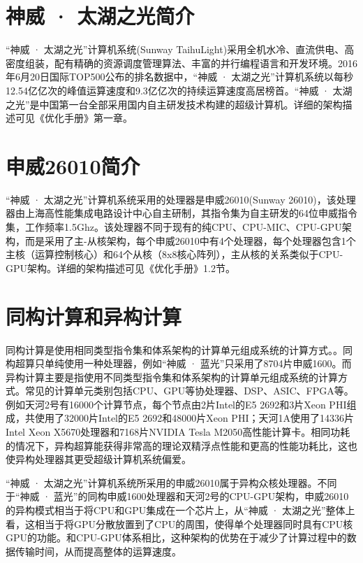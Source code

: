 \section*{神威 · 太湖之光简介}
“神威 · 太湖之光”计算机系统(Sunway TaihuLight)采用全机水冷、直流供电、高密度组装，配有精确的资源调度管理算法、丰富的并行编程语言和开发环境。2016年6月20日国际TOP500公布的排名数据中，“神威 · 太湖之光”计算机系统以每秒12.54亿亿次的峰值运算速度和9.3亿亿次的持续运算速度高居榜首。“神威 · 太湖之光”是中国第一台全部采用国内自主研发技术构建的超级计算机。详细的架构描述可见《优化手册》第一章。

\section*{申威26010简介}
“神威 · 太湖之光”计算机系统采用的处理器是申威26010(Sunway 26010)，该处理器由上海高性能集成电路设计中心自主研制，其指令集为自主研发的64位申威指令集，工作频率1.5Ghz。该处理器不同于现有的纯CPU、CPU-MIC、CPU-GPU架构，而是采用了主-从核架构，每个申威26010中有4个处理器，每个处理器包含1个主核（运算控制核心）和64个从核（8x8核心阵列），主从核的关系类似于CPU-GPU架构。详细的架构描述可见《优化手册》1.2节。

\section*{同构计算和异构计算\cite{noauthor__nodate}}
同构计算是使用相同类型指令集和体系架构的计算单元组成系统的计算方式。。同构超算只单纯使用一种处理器，例如“神威 · 蓝光”只采用了8704片申威1600。而异构计算主要是指使用不同类型指令集和体系架构的计算单元组成系统的计算方式。常见的计算单元类别包括CPU、GPU等协处理器、DSP、ASIC、FPGA等。例如天河2号有16000个计算节点，每个节点由2片Intel的E5 2692和3片Xeon PHI组成，共使用了32000片Intel的E5 2692和48000片Xeon PHI；天河1A使用了14336片Intel Xeon X5670处理器和7168片NVIDIA Tesla M2050高性能计算卡。相同功耗的情况下，异构超算能获得非常高的理论双精浮点性能和更高的性能功耗比，这也使异构处理器其更受超级计算机系统偏爱。

“神威 · 太湖之光”计算机系统所采用的申威26010属于异构众核处理器。不同于“神威 · 蓝光”的同构申威1600处理器和天河2号的CPU-GPU架构，申威26010的异构模式相当于将CPU和GPU集成在一个芯片上，从“神威 · 太湖之光”整体上看，这相当于将GPU分散放置到了CPU的周围，使得单个处理器同时具有CPU核GPU的功能。和CPU-GPU体系相比，这种架构的优势在于减少了计算过程中的数据传输时间，从而提高整体的运算速度。



